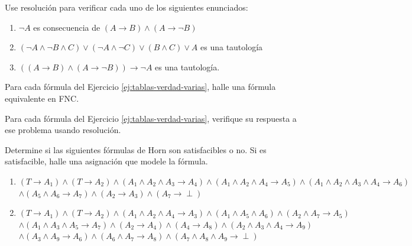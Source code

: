 \message{ !name(main.tex)}\documentclass[12pt,a4paper]{book}
\begin{document}
    \begin{ejercicio}
        Use resolución para verificar cada uno de los siguientes enunciados:
        \begin{enumerate}[label=(\alph*)]
            \item $\neg A$ es consecuencia de $(A\rightarrow B)\wedge(A\rightarrow\neg B)$
            \item $(\neg A\wedge\neg B\wedge C)\vee(\neg A\wedge\neg C)\vee(B\wedge C)\vee A$ es una tautología
            \item $((A\rightarrow B)\wedge(A\rightarrow\neg B))\rightarrow\neg A$ es una tautología.
        \end{enumerate}
    \end{ejercicio}

    \begin{ejercicio}
        Para cada fórmula del Ejercicio \ref{ej:tablas-verdad-varias}, halle una fórmula equivalente en FNC.
    \end{ejercicio}

    \begin{ejercicio}
        Para cada fórmula del Ejercicio \ref{ej:tablas-verdad-varias}, verifique su respuesta a ese problema usando
        resolución.
    \end{ejercicio}

    \begin{ejercicio}
        Determine si las siguientes fórmulas de Horn son satisfacibles o no. Si es satisfacible, halle una asignación que
        modele la fórmula.
        \begin{enumerate}[label=(\alph*)]
            \item $(T\rightarrow A_{1})\wedge(T\rightarrow A_{2})\wedge(A_{1}\wedge A_{2}\wedge A_{3}\rightarrow A_{4})
            \wedge(A_{1}\wedge A_{2}\wedge A_{4}\rightarrow A_{5})\wedge(A_{1}\wedge A_{2}\wedge A_{3}\wedge A_{4}\rightarrow A_{6})$\\
            $\wedge(A_{5}\wedge A_{6}\rightarrow A_{7})\wedge(A_{2}\rightarrow A_{3})\wedge(A_{7}\rightarrow\perp)$
            \item $(T\rightarrow A_{1})\wedge(T\rightarrow A_{2})\wedge(A_{1}\wedge A_{2}\wedge A_{4}\rightarrow A_{3})
            \wedge(A_{1}\wedge A_{5}\wedge A_{6})\wedge(A_{2}\wedge A_{7}\rightarrow A_{5})$\\
            $\wedge(A_{1}\wedge A_{3}\wedge A_{5}\rightarrow A_{7})\wedge(A_{2}\rightarrow A_{4})\wedge(A_{4}\rightarrow A_{8})
            \wedge(A_{2}\wedge A_{3}\wedge A_{4}\rightarrow A_{9})$\\
            $\wedge(A_{3}\wedge A_{9}\rightarrow A_{6})\wedge(A_{6}\wedge A_{7}\rightarrow A_{8})\wedge(A_{7}\wedge A_{8}\wedge A_{9}\rightarrow\perp)$
        \end{enumerate}
    \end{ejercicio}
\end{document}
